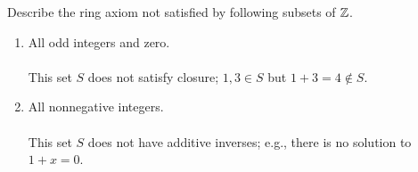 \documentclass[../hw2]{subfiles}
\begin{document}
\begin{problem}[9]
Describe the ring axiom not satisfied by following subsets of $\mathbb{Z}$.
\begin{enumerate}[label=\alph*)]
	\item All odd integers and zero. \\
	      \\
	      This set $S$ does not satisfy closure; $1,3\in S$ but $1 + 3=4\not\in S$.
	\item All nonnegative integers. \\
	      \\
	      This set $S$ does not have additive inverses; e.g., there is no solution to  $1+x=0$.
\end{enumerate}
\end{problem}
\end{document}
